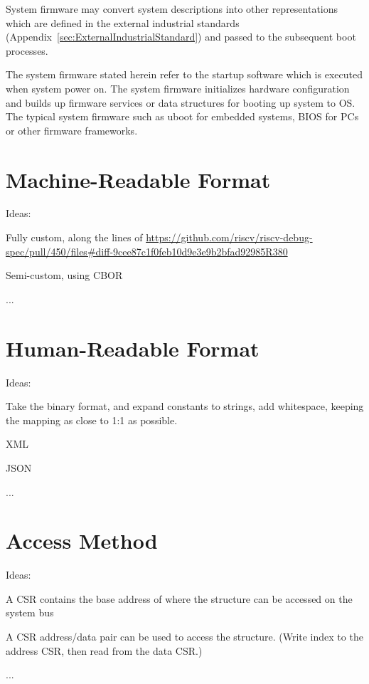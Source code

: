 System firmware may convert system descriptions into other representations which are 
defined in the external industrial standards (Appendix~\ref{sec:ExternalIndustrialStandard})
and passed to the subsequent boot processes.

\begin{commentary}
The system firmware stated herein refer to the startup software which is executed 
when system power on. The system firmware initializes hardware configuration and 
builds up firmware services or data structures for booting up system to OS. The typical
system firmware such as uboot for embedded systems, BIOS for PCs or other firmware 
frameworks.

\end{commentary}

\chapter{Machine-Readable Format}

\begin{steps}{Ideas:}
\item Fully custom, along the lines of
    \url{https://github.com/riscv/riscv-debug-spec/pull/450/files#diff-9cee87c1f0feb10d9e3e9b2bfad92985R380}
\item Semi-custom, using CBOR
\item ...
\end{steps}

\chapter{Human-Readable Format}

\begin{steps}{Ideas:}
\item Take the binary format, and expand constants to strings, add whitespace,
keeping the mapping as close to 1:1 as possible.
\item XML
\item JSON
\item ...
\end{steps}

\chapter{Access Method}
\label{sec:AccessMethod}

\begin{steps}{Ideas:}
\item A CSR contains the base address of where the structure can be accessed on
the system bus
\item A CSR address/data pair can be used to access the structure. (Write index
to the address CSR, then read from the data CSR.)
\item ...
\end{steps}
